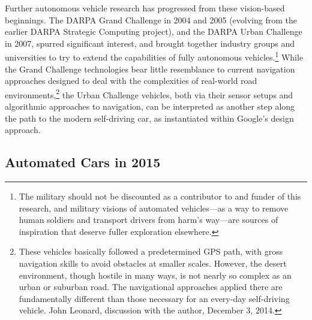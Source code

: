 
Further autonomous vehicle research has progressed from
these vision-based beginnings. The
DARPA Grand Challenge in 2004 and 2005 (evolving from the earlier
  DARPA Strategic Computing project), and the DARPA Urban Challenge 
in 2007, spurred significant interest, and brought together industry
groups and universities to 
try to extend the capabilities of fully autonomous vehicles.\footnote{The
military should not be discounted as a contributor to and funder of
  this research, and military visions of automated vehicles---as a way
  to remove human soldiers and transport drivers from harm's way---are
  sources of inspiration that deserve fuller
  exploration elsewhere.} While the
Grand Challenge technologies bear little resemblance to current
navigation approaches designed to deal with the complexities of
real-world road environments,\footnote{These vehicles basically
  followed a predetermined GPS path, with gross navigation skills to
  avoid obstacles at smaller scales. However, the desert environment,
  though hostile in many ways, is not nearly so complex as an urban or
suburban road. The navigational approaches applied there are
fundamentally different than those necessary for an every-day
self-driving vehicle. John Leonard,
  discussion with the author, December 3, 2014.} the Urban Challenge
vehicles, both via their sensor setups and algorithmic approaches to
navigation, can be interpreted as another step along the path to the
modern self-driving car, as instantiated within Google's design approach. 

\subsection{Automated Cars in 2015}

